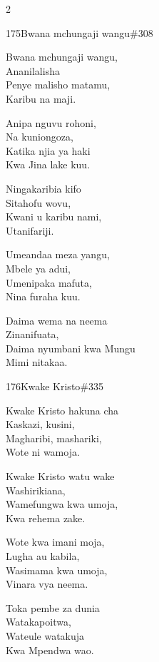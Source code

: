 \documentclass{article}
\begin{document}
\begin{multicols}{2}
\begin{hymn}{175}{Bwana mchungaji wangu}{\#308}
\begin{stanza}
Bwana mchungaji wangu,\\
Ananilalisha\\
Penye malisho matamu,\\
Karibu na maji.
\end{stanza}
\begin{stanza}
Anipa nguvu rohoni,\\
Na kuniongoza,\\
Katika njia ya haki\\
Kwa Jina lake kuu.
\end{stanza}
\begin{stanza}
Ningakaribia kifo\\
Sitahofu wovu,\\
Kwani u karibu nami,\\
Utanifariji.
\end{stanza}
\begin{stanza}
Umeandaa meza yangu,\\
Mbele ya adui,\\
Umenipaka mafuta,\\
Nina furaha kuu.
\end{stanza}
\begin{stanza}
Daima wema na neema\\
Zinanifuata,\\
Daima nyumbani kwa Mungu\\
Mimi nitakaa.
\end{stanza}
\end{hymn}

\begin{hymn}{176}{Kwake Kristo}{\#335}
\begin{stanza}
Kwake Kristo hakuna cha\\
Kaskazi, kusini,\\
Magharibi, mashariki,\\
Wote ni wamoja.
\end{stanza}
\begin{stanza}
Kwake Kristo watu wake\\
Washirikiana,\\
Wamefungwa kwa umoja,\\
Kwa rehema zake.
\end{stanza}
\begin{stanza}
Wote kwa imani moja,\\
Lugha au kabila,\\
Wasimama kwa umoja,\\
Vinara vya neema.
\end{stanza}
\begin{stanza}
Toka pembe za dunia\\
Watakapoitwa,\\
Wateule watakuja\\
Kwa Mpendwa wao.
\end{stanza}
\end{hymn}


\end{multicols}
\end{document}
